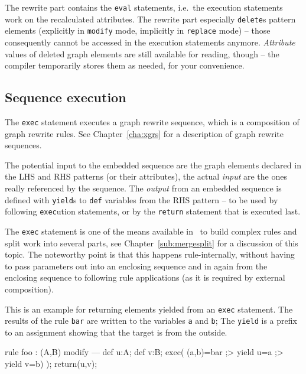 The rewrite part contains the \texttt{eval} statements, i.e.\ the execution statements work on the recalculated attributes.
The rewrite part especially \texttt{delete}s pattern elements (explicitly in \texttt{modify} mode, implicitly in \texttt{replace} mode) -- those consequently cannot be accessed in the execution statements anymore.
\emph{Attribute} values of deleted graph elements are still available for reading, though -- the compiler temporarily stores them as needed, for your convenience.

\subsection*{Sequence execution}
The \texttt{exec} statement executes a graph rewrite sequence, which is a composition of graph rewrite rules.
See Chapter~\ref{cha:xgrs} for a description of graph rewrite sequences.

The potential input to the embedded sequence are the graph elements declared in the LHS and RHS patterns (or their attributes), the actual \emph{input} are the ones really referenced by the sequence. 
The \emph{output} from an embedded sequence is defined with \texttt{yield}s to \texttt{def} variables from the RHS pattern --
to be used by following \texttt{exec}ution statements, or by the \texttt{return} statement that is executed last.  

The \texttt{exec} statement is one of the means available in \GrG~to build complex rules and split work into several parts, see Chapter~\ref{sub:mergesplit} for a discussion of this topic. The noteworthy point is that this happens rule-internally, without having to pass parameters out into an enclosing sequence and in again from the enclosing sequence to following rule applications (as it is required by external composition).

\begin{example}
This is an example for returning elements yielded from an \texttt{exec} statement.
The results of the rule \texttt{bar} are written to the variables \texttt{a} and \texttt{b};
The \texttt{yield} is a prefix to an assignment showing that the target is from the outside.

	\begin{grgen}
rule foo : (A,B)
{
  modify {
  ---
    def u:A; def v:B;
    exec( (a,b)=bar ;> yield u=a ;> yield v=b) );
    return(u,v);
  }
}
	\end{grgen}
\end{example}

